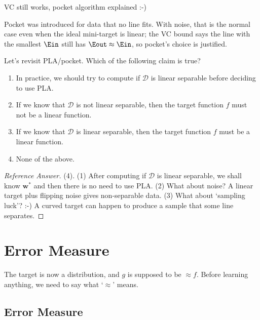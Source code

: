 \begin{moral}
    VC still works, pocket algorithm explained :-)
\end{moral}

Pocket was introduced for data that no line fits. With noise, that is the
normal case even when the ideal mini-target is linear; the VC bound says the
line with the smallest \(\Ein\) still has \(\Eout \approx \Ein\), so pocket's
choice is justified.

\begin{exercise}
    Let's revisit PLA/pocket. Which of the following claim is true?
    \begin{enumerate}[(1)]
        \item In practice, we should try to compute if \(\mathcal{D}\) is
            linear separable before deciding to use PLA.
        \item If we know that \(\mathcal{D}\) is not linear separable, then the
            target function \(f\) must not be a linear function.
        \item If we know that \(\mathcal{D}\) is linear separable, then the
            target function \(f\) must be a linear function.
        \item None of the above.
    \end{enumerate}
\end{exercise}

\begin{proof}[Reference Answer]
    (4). (1) After computing if \(\mathcal{D}\) is linear separable, we shall
    know \(\bm{w}^*\) and then there is no need to use PLA. (2) What about
    noise? A linear target plus flipping noise gives non-separable data.
    (3) What about `sampling luck'? :-) A curved target can happen to produce a
    sample that some line separates.
\end{proof}

\section{Error Measure}\label{sec:error-measure}


The target is now a distribution, and \(g\) is supposed to be \(\approx f\).
Before learning anything, we need to say what `\(\approx\)' means.

\subsection{Error Measure}

